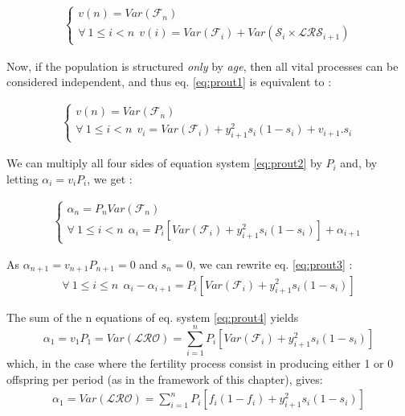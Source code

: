 \documentclass[10pt,a4paper]{article}
\begin{document}
\begin{eqnarray} \left\{ \begin{array}{l}
v(n)=Var(\mathcal{F}_{n}) \\
\forall~ 1 \leq i<n ~~ v(i)= Var(\mathcal{F}_{i}) + Var(\mathcal{S}_{i}\times\mathcal{LRS}_{i+1}) 
\label{eq:prout1}
\end{array} \right.
\end{eqnarray}

Now, if the population is structured \emph{only} by \emph{age}, then all vital processes can be considered independent, and thus eq. \ref{eq:prout1} is equivalent to :

\begin{eqnarray} \left\{ \begin{array}{l}
v(n)=Var(\mathcal{F}_{n}) \\
\forall~ 1 \leq i<n ~~ v_{i}= Var(\mathcal{F}_{i}) +y_{i+1}^{2}s_{i}(1-s_{i}) +v_{i+1}.s_{i}  
\label{eq:prout2}
\end{array} \right.
\end{eqnarray}

We can multiply all four sides of equation system \ref{eq:prout2} by $P_{i}$ and, by letting $\alpha_i=v_{i}P_{i}$, we get :

\begin{eqnarray} \left\{ \begin{array}{l}
\alpha_n=P_{n}Var(\mathcal{F}_{n}) \\
\forall~ 1 \leq i<n ~~ \alpha_{i}= P_{i}\left[ Var(\mathcal{F}_{i}) +y_{i+1}^{2}s_{i}(1-s_{i})\right]  +\alpha_{i+1}  
\label{eq:prout3}
\end{array} \right.
\end{eqnarray}


As $\alpha_{n+1}=v_{n+1}P_{n+1}=0$ and $s_{n}=0$, we can rewrite eq. \ref{eq:prout3} :
\begin{eqnarray}
\forall~ 1 \leq i\leq n ~~ \alpha_{i}-\alpha_{i+1}  = P_{i}\left[ Var(\mathcal{F}_{i}) +y_{i+1}^{2}s_{i}(1-s_{i})\right]  
\label{eq:prout4}
\end{eqnarray}

The sum of the n equations of eq. system \ref{eq:prout4} yields
\[
\alpha_1=v_{1}P_{1}=Var(\mathcal{LRO})=\sum_{i=1}^{n} P_{i}\left[ Var(\mathcal{F}_{i}) +y_{i+1}^{2}s_{i}(1-s_{i})\right]
\]
which, in the case where the fertility process consist in producing either 1 or 0 offspring per period (as in the framework of this chapter), gives:
\begin{eqnarray}
\alpha_1=Var(\mathcal{LRO})=\sum_{i=1}^{n} P_{i}\left[ f_{i}(1-f_{i}) +y_{i+1}^{2}s_{i}(1-s_{i})\right]
\label{eq:prout5}
\end{eqnarray}
\end{document}
